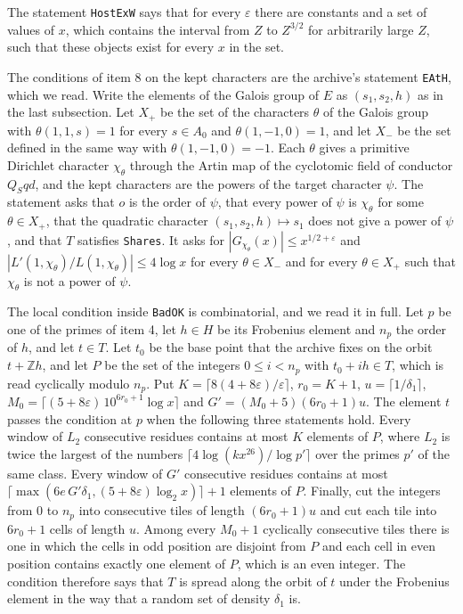 \documentclass[11pt,letterpaper]{article}
\numberwithin{equation}{section}
\begin{document}
The statement \texttt{HostExW} says that for every $\varepsilon$ there are constants and a set of values of $x$, which contains the interval from $Z$ to $Z^{3/2}$ for arbitrarily large $Z$, such that these objects exist for every $x$ in the set.

The conditions of item 8 on the kept characters are the archive's statement \texttt{EAtH}, which we read. Write the elements of the Galois group of $E$ as $(s_1,s_2,h)$ as in the last subsection. Let $X_+$ be the set of the characters $\theta$ of the Galois group with $\theta(1,1,s)=1$ for every $s\in A_0$ and $\theta(1,-1,0)=1$, and let $X_-$ be the set defined in the same way with $\theta(1,-1,0)=-1$. Each $\theta$ gives a primitive Dirichlet character $\chi_\theta$ through the Artin map of the cyclotomic field of conductor $Q_Sqd$, and the kept characters are the powers of the target character $\psi$. The statement asks that $o$ is the order of $\psi$, that every power of $\psi$ is $\chi_\theta$ for some $\theta\in X_+$, that the quadratic character $(s_1,s_2,h)\mapsto s_1$ does not give a power of $\psi$, and that $T$ satisfies \texttt{Shares}. It asks for $|G_{\chi_\theta}(x)|\le x^{1/2+\varepsilon}$ and $|L'(1,\chi_\theta)/L(1,\chi_\theta)|\le4\log x$ for every $\theta\in X_-$ and for every $\theta\in X_+$ such that $\chi_\theta$ is not a power of $\psi$.

The local condition inside \texttt{BadOK} is combinatorial, and we read it in full. Let $p$ be one of the primes of item 4, let $h\in H$ be its Frobenius element and $n_p$ the order of $h$, and let $t\in T$. Let $t_0$ be the base point that the archive fixes on the orbit $t+\mathbb Zh$, and let $P$ be the set of the integers $0\le i<n_p$ with $t_0+ih\in T$, which is read cyclically modulo $n_p$. Put $K=\lceil8(4+8\varepsilon)/\varepsilon\rceil$, $r_0=K+1$, $u=\lceil1/\delta_1\rceil$, $M_0=\lceil(5+8\varepsilon)\,10^{6r_0+1}\log x\rceil$ and $G'=(M_0+5)(6r_0+1)u$. The element $t$ passes the condition at $p$ when the following three statements hold. Every window of $L_2$ consecutive residues contains at most $K$ elements of $P$, where $L_2$ is twice the largest of the numbers $\lceil4\log(kx^{26})/\log p'\rceil$ over the primes $p'$ of the same class. Every window of $G'$ consecutive residues contains at most $\lceil\max(6e\,G'\delta_1,(5+8\varepsilon)\log_2x)\rceil+1$ elements of $P$. Finally, cut the integers from $0$ to $n_p$ into consecutive tiles of length $(6r_0+1)u$ and cut each tile into $6r_0+1$ cells of length $u$. Among every $M_0+1$ cyclically consecutive tiles there is one in which the cells in odd position are disjoint from $P$ and each cell in even position contains exactly one element of $P$, which is an even integer. The condition therefore says that $T$ is spread along the orbit of $t$ under the Frobenius element in the way that a random set of density $\delta_1$ is.
\end{document}
